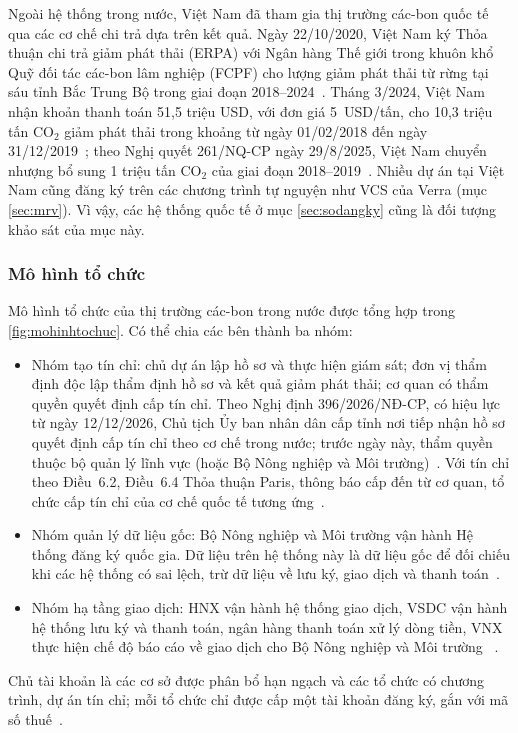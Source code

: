 Ngoài hệ thống trong nước, Việt Nam đã tham gia thị trường các-bon quốc tế qua các cơ chế chi trả dựa trên kết quả. Ngày 22/10/2020, Việt Nam ký Thỏa thuận chi trả giảm phát thải (ERPA) với Ngân hàng Thế giới trong khuôn khổ Quỹ đối tác các-bon lâm nghiệp (FCPF) cho lượng giảm phát thải từ rừng tại sáu tỉnh Bắc Trung Bộ trong giai đoạn 2018--2024~\cite{worldbank2020erpa}. Tháng 3/2024, Việt Nam nhận khoản thanh toán 51,5 triệu USD, với đơn giá 5~USD/tấn, cho 10,3 triệu tấn CO$_2$ giảm phát thải trong khoảng từ ngày 01/02/2018 đến ngày 31/12/2019~\cite{baochinhphu2024erpa}; theo Nghị quyết 261/NQ-CP ngày 29/8/2025, Việt Nam chuyển nhượng bổ sung 1 triệu tấn CO$_2$ của giai đoạn 2018--2019~\cite{vietnamfinance2025erpa}. Nhiều dự án tại Việt Nam cũng đăng ký trên các chương trình tự nguyện như VCS của Verra (mục \ref{sec:mrv}). Vì vậy, các hệ thống quốc tế ở mục \ref{sec:sodangky} cũng là đối tượng khảo sát của mục này.

\subsubsection*{Mô hình tổ chức}

\HinhMoHinhToChuc

Mô hình tổ chức của thị trường các-bon trong nước được tổng hợp trong \autoref{fig:mohinhtochuc}. Có thể chia các bên thành ba nhóm:
\begin{itemize}
    \item Nhóm tạo tín chỉ: chủ dự án lập hồ sơ và thực hiện giám sát; đơn vị thẩm định độc lập thẩm định hồ sơ và kết quả giảm phát thải; cơ quan có thẩm quyền quyết định cấp tín chỉ. Theo Nghị định 396/2026/NĐ-CP, có hiệu lực từ ngày 12/12/2026, Chủ tịch Ủy ban nhân dân cấp tỉnh nơi tiếp nhận hồ sơ quyết định cấp tín chỉ theo cơ chế trong nước; trước ngày này, thẩm quyền thuộc bộ quản lý lĩnh vực (hoặc Bộ Nông nghiệp và Môi trường)~\cite{vietnam2026nghidinh396}. Với tín chỉ theo Điều~6.2, Điều~6.4 Thỏa thuận Paris, thông báo cấp đến từ cơ quan, tổ chức cấp tín chỉ của cơ chế quốc tế tương ứng~\cite{vietnam2026thongtu11}.
    \item Nhóm quản lý dữ liệu gốc: Bộ Nông nghiệp và Môi trường vận hành Hệ thống đăng ký quốc gia. Dữ liệu trên hệ thống này là dữ liệu gốc để đối chiếu khi các hệ thống có sai lệch, trừ dữ liệu về lưu ký, giao dịch và thanh toán~\cite{vietnam2026thongtu11}.
    \item Nhóm hạ tầng giao dịch: HNX vận hành hệ thống giao dịch, VSDC vận hành hệ thống lưu ký và thanh toán, ngân hàng thanh toán xử lý dòng tiền, VNX thực hiện chế độ báo cáo về giao dịch cho Bộ Nông nghiệp và Môi trường~\cite{vietnam2026nghidinh29} \cite{vietnam2026thongtu11}.
\end{itemize}
Chủ tài khoản là các cơ sở được phân bổ hạn ngạch và các tổ chức có chương trình, dự án tín chỉ; mỗi tổ chức chỉ được cấp một tài khoản đăng ký, gắn với mã số thuế~\cite{vietnam2026thongtu11}.

